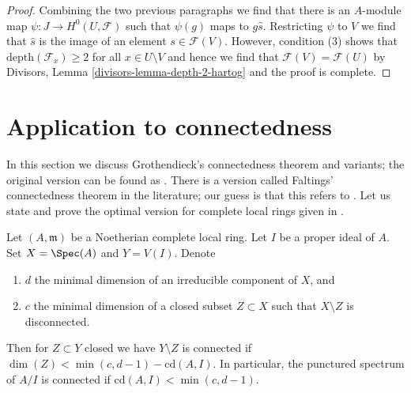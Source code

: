 \begin{proof}
\medskip\noindent
Combining the two previous paragraphs we find that
there is an $A$-module map $\psi : J \to H^0(U, \mathcal{F})$
such that $\psi(g)$ maps to $g\hat s$. Restricting $\psi$ to $V$
we find that $\hat s$ is the image of an element $s \in \mathcal{F}(V)$.
However, condition (3) shows that $\text{depth}(\mathcal{F}_x) \geq 2$
for all $x \in U \setminus V$ and hence we find that
$\mathcal{F}(V) = \mathcal{F}(U)$ by
Divisors, Lemma \ref{divisors-lemma-depth-2-hartog}
and the proof is complete.
\end{proof}





\section{Application to connectedness}
\label{section-connected}

\noindent
In this section we discuss Grothendieck's connectedness theorem
and variants; the original version can be found as
\cite[Exposee XIII, Theorem 2.1]{SGA2}. There is a version
called Faltings' connectedness theorem in the literature;
our guess is that this refers to \cite[Theorem 6]{Faltings-some}.
Let us state and prove the optimal version for complete
local rings given in \cite[Theorem 1.6]{Varbaro}.

\begin{lemma}
\label{lemma-punctured-still-connected}
\begin{reference}
\cite[Theorem 1.6]{Varbaro}
\end{reference}
Let $(A, \mathfrak m)$ be a Noetherian complete local ring.
Let $I$ be a proper ideal of $A$.
Set $X = \Spec(A)$ and $Y = V(I)$.
Denote
\begin{enumerate}
\item $d$ the minimal dimension of an irreducible component of $X$, and
\item $c$ the minimal dimension of a closed subset $Z \subset X$
such that $X \setminus Z$ is disconnected.
\end{enumerate}
Then for $Z \subset Y$ closed we have $Y \setminus Z$ is connected if
$\dim(Z) < \min(c, d - 1) - \text{cd}(A, I)$. In particular, the punctured
spectrum of $A/I$ is connected if $\text{cd}(A, I) < \min(c, d - 1)$.
\end{lemma}


